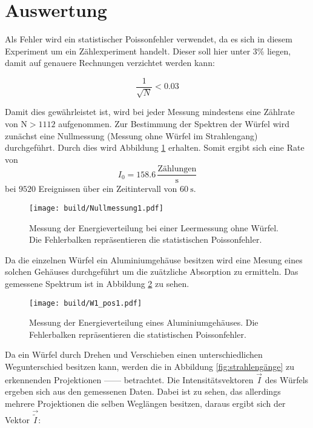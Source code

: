 \newpage
\section{Auswertung}

\label{sec:Auswertung}
Als Fehler wird ein statistischer Poissonfehler verwendet, da es sich in diesem
Experiment um ein Zählexperiment handelt. Dieser soll hier unter 3\% liegen,
damit auf genauere Rechnungen verzichtet werden kann:

\begin{equation*}
  \frac{1}{\sqrt{N}} < 0.03
\end{equation*}

Damit dies gewährleistet ist, wird bei jeder Messung mindestens eine
Zählrate von $\text{N}>1112$ aufgenommen.
Zur Bestimmung der Spektren der Würfel wird zunächst eine Nullmessung (Messung
ohne Würfel im Strahlengang) durchgeführt. Durch dies wird Abbildung \ref{fig:leer}
erhalten. Somit ergibt sich eine Rate von
\begin{equation*}
    I_0 = 158.6 \,\frac{\text{Zählungen}}{\text{s}}
\end{equation*}
bei $9520$ Ereignissen über ein Zeitintervall von $\SI{60}{\second}$.

\begin{figure}[htb]
  \centering
  \texttt{[image: build/Nullmessung1.pdf]}
  \caption{Messung der Energieverteilung bei einer Leermessung ohne Würfel. Die
  Fehlerbalken repräsentieren die statistischen Poissonfehler.}
  \label{fig:leer}
\end{figure}

Da die einzelnen Würfel ein Aluminiumgehäuse besitzen wird eine Mesung eines solchen
Gehäuses durchgeführt um die zuätzliche Absorption zu ermitteln. Das gemessene Spektrum ist in
Abbildung \ref{fig:alu} zu sehen.

\begin{figure}[htb]
  \centering
  \texttt{[image: build/W1\_pos1.pdf]}
  \caption{Messung der Energieverteilung eines Aluminiumgehäuses. Die Fehlerbalken
  repräsentieren die statistischen Poissonfehler.}
  \label{fig:alu}
\end{figure}

Da ein Würfel durch Drehen und Verschieben einen unterschiedlichen Wegunterschied
besitzen kann, werden die in Abbildung \ref{fig:strahlengänge} zu erkennenden Projektionen
------ betrachtet. Die Intensitätsvektoren $\vec{I}$ des Würfels ergeben sich aus
den gemessenen Daten. Dabei ist zu sehen, das allerdings mehrere Projektionen die selben Weglängen
besitzen, daraus ergibt sich der Vektor $\vec{\tilde{I}}$:

